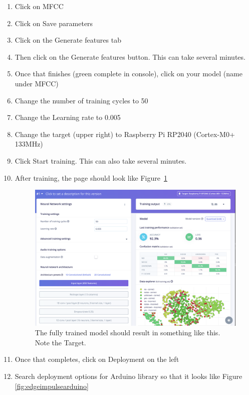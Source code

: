 \begin{enumerate}
  \item Click on MFCC
  \item Click on Save parameters
  \item Click on the Generate features tab
  \item Then click on the Generate features button. This can take several minutes.
  \item Once that finishes (green complete in console), click on your model 
          (name under MFCC)
  \item Change the number of training cycles to 50
  \item Change the Learning rate to 0.005
  \item Change the target (upper right) to Raspberry Pi RP2040 (Cortex-M0+ 133MHz)
  \item Click Start training. This can also take several minutes.
  \item After training, the page should look like Figure~\ref{fig:edgeimpulsetrained}

  \begin{figure}[!htb]
    \centering
    \includegraphics[scale=0.3]{machineLearning/trained.png}
    \caption{The fully trained model should result in something like this. Note the Target.}
    \label{fig:edgeimpulsetrained}
  \end{figure} 

  \item Once that completes, click on Deployment on the left 
  \item Search deployment options for Arduino library so that it looks like Figure \ref{fig:edgeimpulsearduino}


\end{enumerate}
